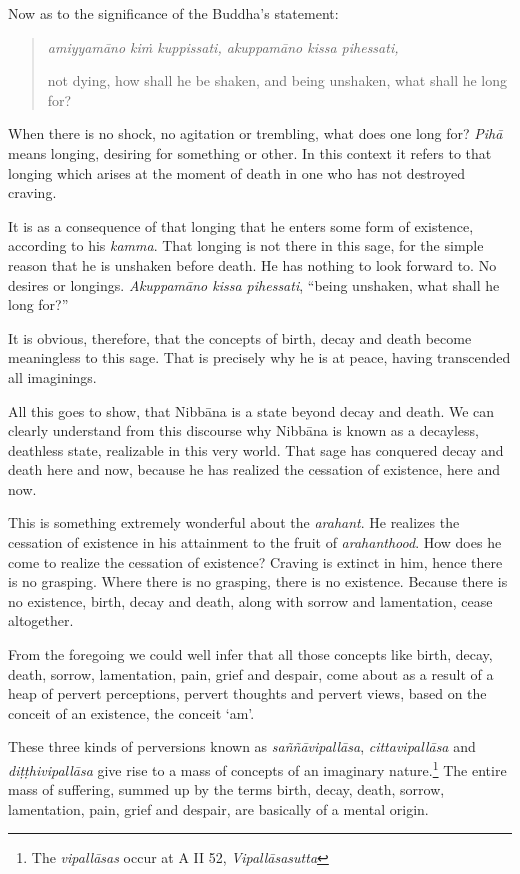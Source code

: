 \clearpage

Now as to the significance of the Buddha's statement:

\begin{quote}
\emph{amiyyamāno kiṁ kuppissati, akuppamāno kissa pihessati,}

not dying, how shall he be shaken, and being unshaken, what shall he long for?
\end{quote}

When there is no shock, no agitation or trembling, what does one long for? \emph{Pihā} means longing, desiring for something or other. In this context it refers to that longing which arises at the moment of death in one who has not destroyed craving.

It is as a consequence of that longing that he enters some form of existence, according to his \emph{kamma}. That longing is not there in this sage, for the simple reason that he is unshaken before death. He has nothing to look forward to. No desires or longings. \emph{Akuppamāno kissa pihessati}, ``being unshaken, what shall he long for?''

It is obvious, therefore, that the concepts of birth, decay and death become meaningless to this sage. That is precisely why he is at peace, having transcended all imaginings.

All this goes to show, that Nibbāna is a state beyond decay and death. We can clearly understand from this discourse why Nibbāna is known as a decayless, deathless state, realizable in this very world. That sage has conquered decay and death here and now, because he has realized the cessation of existence, here and now.

This is something extremely wonderful about the \emph{arahant}. He realizes the cessation of existence in his attainment to the fruit of \emph{arahanthood}. How does he come to realize the cessation of existence? Craving is extinct in him, hence there is no grasping. Where there is no grasping, there is no existence. Because there is no existence, birth, decay and death, along with sorrow and lamentation, cease altogether.

From the foregoing we could well infer that all those concepts like birth, decay, death, sorrow, lamentation, pain, grief and despair, come about as a result of a heap of pervert perceptions, pervert thoughts and pervert views, based on the conceit of an existence, the conceit `am'.

These three kinds of perversions known as \emph{saññāvipallāsa}, \emph{cittavipallāsa} and \emph{diṭṭhivipallāsa} give rise to a mass of concepts of an imaginary nature.\footnote{The \emph{vipallāsas} occur at A II 52, \emph{Vipallāsasutta}} The entire mass of suffering, summed up by the terms birth, decay, death, sorrow, lamentation, pain, grief and despair, are basically of a mental origin.

